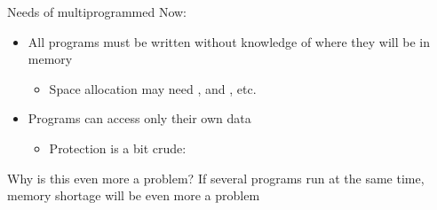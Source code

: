 \begin{parag}{Needs of multiprogrammed}
    Now:
	\begin{itemize}
		\item All programs must be written without knowledge of where they will be in memory
			\begin{itemize}
				\item Space allocation may need ,  and , etc.
			\end{itemize}
		\item Programs can access only their own data
			\begin{itemize}
				\item Protection is a bit crude: 
			\end{itemize}
	\end{itemize}
	\begin{subparag}{Why is this even more a problem?}
	    If several programs run at the same time, memory shortage will be even more a problem
	\end{subparag}
	
\end{parag}

